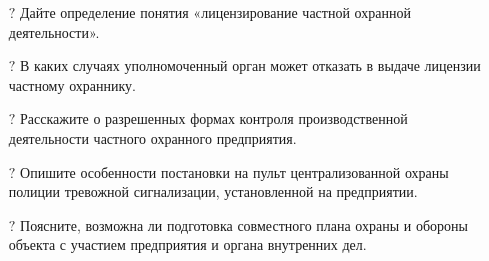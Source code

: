 \documentclass[a4paper,12pt,fleqn]{article} %
\begin{document}
\begin{tcolorbox}[colback=blue!40!red!1!,colframe=blue!40!red,enforce breakable,%
	pad at break=1mm, title=Вопросы и задания для самоконтроля]
	\begin{itemize}
		\item[{\color{blue!55!red}\Huge { $ ? $}} ]  Дайте определение понятия «лицензирование частной охранной деятельности».
		\item[{\color{blue!55!red}\Huge {  $ ? $}} ] В каких случаях уполномоченный орган может отказать в выдаче лицензии частному охраннику.
		\item[{\color{blue!55!red}\Huge {  $ ? $}} ] Расскажите о разрешенных формах контроля производственной деятельности частного охранного предприятия.
		\item[{\color{blue!55!red}\Huge {  $ ? $}} ] Опишите особенности постановки на пульт централизованной охраны полиции тревожной сигнализации, установленной на предприятии.
		\item[{\color{blue!55!red}\Huge {  $ ? $}} ] Поясните, возможна ли подготовка совместного плана охраны и обороны объекта с участием предприятия и органа внутренних дел.
	\end{itemize}		
\end{tcolorbox}
\end{document}
